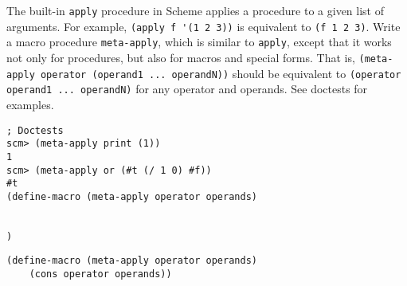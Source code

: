 \begin{blocksection}
\question The built-in \lstinline{apply} procedure in Scheme applies a procedure to a given list of arguments. For example, \lstinline{(apply f '(1 2 3))} is equivalent to \lstinline{(f 1 2 3)}. Write a macro procedure \lstinline{meta-apply}, which is similar to \lstinline{apply}, except that it works not only for procedures, but also for macros and special forms. That is, \lstinline{(meta-apply operator (operand1 ... operandN))} should be equivalent to \lstinline{(operator operand1 ... operandN)} for any operator and operands. See doctests for examples. 

\begin{lstlisting}
; Doctests
scm> (meta-apply print (1)) 
1
scm> (meta-apply or (#t (/ 1 0) #f))
#t
(define-macro (meta-apply operator operands)
    

)
\end{lstlisting}

\begin{solution}
\begin{lstlisting}
(define-macro (meta-apply operator operands)
    (cons operator operands))
\end{lstlisting}
\end{solution}
\end{blocksection}